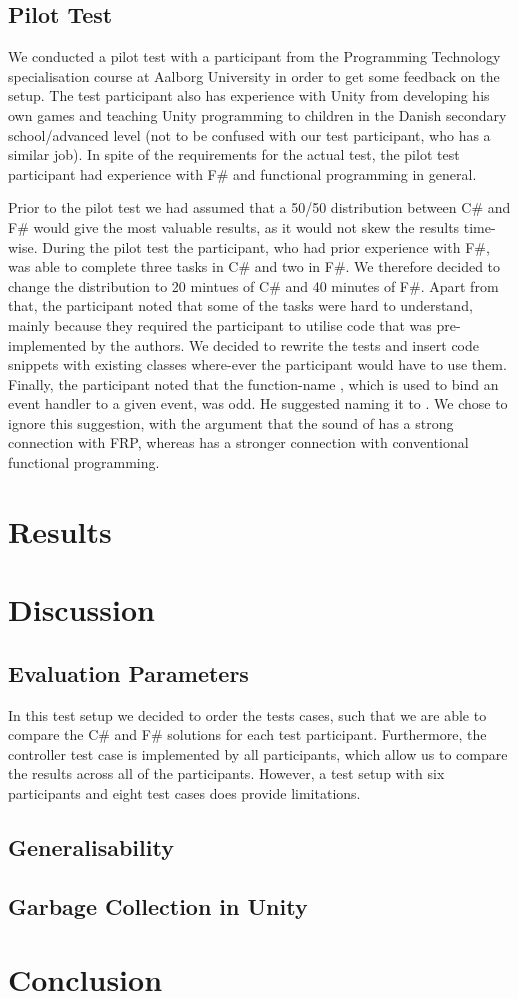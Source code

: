 \subsection{Pilot Test}
We conducted a pilot test with a participant from the Programming Technology specialisation course at Aalborg University in order to get some feedback on the setup. The test participant also has experience with Unity from developing his own games and teaching Unity programming to children in the Danish secondary school/advanced level (not to be confused with our test participant, who has a similar job). In spite of the requirements for the actual test, the pilot test participant had experience with F\# and functional programming in general.

Prior to the pilot test we had assumed that a 50/50 distribution between C\# and F\# would give the most valuable results, as it would not skew the results time-wise. During the pilot test the participant, who had prior experience with F\#, was able to complete three tasks in C\# and two in F\#. We therefore decided to change the distribution to 20 mintues of C\# and 40 minutes of F\#. Apart from that, the participant noted that some of the tasks were hard to understand, mainly because they required the participant to utilise code that was pre-implemented by the authors. We decided to rewrite the tests and insert code snippets with existing classes where-ever the participant would have to use them. Finally, the participant noted that the function-name , which is used to bind an event handler to a given event, was odd. He suggested naming it to . We chose to ignore this suggestion, with the argument that the sound of  has a strong connection with \gls{FRP}, whereas  has a stronger connection with conventional functional programming.

\section{Results}

\section{Discussion}

\subsection{Evaluation Parameters}
In this test setup we decided to order the tests cases, such that we are able to compare the C\# and F\# solutions for each test participant. Furthermore, the controller test case is implemented by all participants, which allow us to compare the results across all of the participants. However, a test setup with six participants and eight test cases does provide limitations. 

\subsection{Generalisability}

\subsection{Garbage Collection in Unity}

\section{Conclusion}